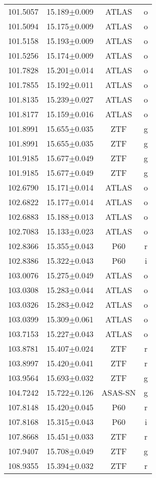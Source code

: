 \begin{table}
\begin{tabular}{cccc}
101.5057 & 15.189$\pm$0.009 & ATLAS & o \\
101.5094 & 15.175$\pm$0.009 & ATLAS & o \\
101.5158 & 15.193$\pm$0.009 & ATLAS & o \\
101.5256 & 15.174$\pm$0.009 & ATLAS & o \\
101.7828 & 15.201$\pm$0.014 & ATLAS & o \\
101.7855 & 15.192$\pm$0.011 & ATLAS & o \\
101.8135 & 15.239$\pm$0.027 & ATLAS & o \\
101.8177 & 15.159$\pm$0.016 & ATLAS & o \\
101.8991 & 15.655$\pm$0.035 & ZTF & g \\
101.8991 & 15.655$\pm$0.035 & ZTF & g \\
101.9185 & 15.677$\pm$0.049 & ZTF & g \\
101.9185 & 15.677$\pm$0.049 & ZTF & g \\
102.6790 & 15.171$\pm$0.014 & ATLAS & o \\
102.6822 & 15.177$\pm$0.014 & ATLAS & o \\
102.6883 & 15.188$\pm$0.013 & ATLAS & o \\
102.7083 & 15.133$\pm$0.023 & ATLAS & o \\
102.8366 & 15.355$\pm$0.043 & P60 & r \\
102.8386 & 15.322$\pm$0.043 & P60 & i \\
103.0076 & 15.275$\pm$0.049 & ATLAS & o \\
103.0308 & 15.283$\pm$0.044 & ATLAS & o \\
103.0326 & 15.283$\pm$0.042 & ATLAS & o \\
103.0399 & 15.309$\pm$0.061 & ATLAS & o \\
103.7153 & 15.227$\pm$0.043 & ATLAS & o \\
103.8781 & 15.407$\pm$0.024 & ZTF & r \\
103.8997 & 15.420$\pm$0.041 & ZTF & r \\
103.9564 & 15.693$\pm$0.032 & ZTF & g \\
104.7242 & 15.722$\pm$0.126 & ASAS-SN & g \\
107.8148 & 15.420$\pm$0.045 & P60 & r \\
107.8168 & 15.315$\pm$0.043 & P60 & i \\
107.8668 & 15.451$\pm$0.033 & ZTF & r \\
107.9407 & 15.708$\pm$0.049 & ZTF & g \\
108.9355 & 15.394$\pm$0.032 & ZTF & r \\

\end{tabular}
\end{table}
